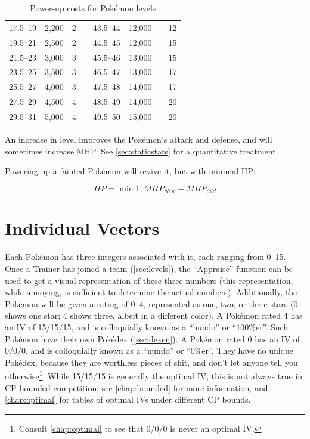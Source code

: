 \begin{table}
\begin{tabular}[ht]{rrrr|rrrr}
17.5--19 & 2,200 & 2 & & 43.5--44 & 12,000 &    & 12 \\
19.5--21 & 2,500 & 2 & & 44.5--45 & 12,000 &    & 15 \\
21.5--23 & 3,000 & 3 & & 45.5--46 & 13,000 &    & 15 \\
23.5--25 & 3,500 & 3 & & 46.5--47 & 13,000 &    & 17 \\
25.5--27 & 4,000 & 3 & & 47.5--48 & 14,000 &    & 17 \\ 
27.5--29 & 4,500 & 4 & & 48.5--49 & 14,000 &    & 20 \\
29.5--31 & 5,000 & 4 & & 49.5--50 & 15,000 &    & 20 \\
\end{tabular}
\caption{Power-up costs for Pokémon levels}
\label{table:powerups}
\end{table}
An increase in level improves the Pokémon's attack and defense, and
  will sometimes increase MHP\@.
See \autoref{sec:staticstats} for a quantitative treatment.

Powering up a fainted Pokémon will revive it, but with minimal HP\@:

\[ HP = \min{1, MHP_{New} - MHP_{Old} } \]

\section{Individual Vectors}
\label{sec:ivs}
Each Pokémon has three integers associated with it, each ranging from 0--15.
Once a Trainer has joined a team (\autoref{sec:levels}), the ``Appraise'' function can be used to
  get a visual representation of these three numbers (this representation,
  while annoying, is sufficient to determine the actual numbers).
Additionally, the Pokémon will be given a rating of 0--4, represented as
  one, two, or three stars (0 shows one star; 4 shows three, albeit in a different color).
A Pokémon rated 4 has an IV of 15/15/15, and is colloquially known as a ``hundo'' or ``100\%er''.
Such Pokémon have their own Pokédex (\autoref{sec:dexen}).
A Pokémon rated 0 has an IV of 0/0/0, and is colloquially known as a ``nundo'' or ``0\%er''.
They have no unique Pokédex, because they are worthless pieces of shit,
  and don't let anyone tell you otherwise\footnote{Consult \autoref{chap:optimal}
  to see that 0/0/0 is never an optimal IV.}.
While 15/15/15 is generally the optimal IV, this is not always true in CP-bounded
  competition; see \autoref{chap:bounded} for more information,
  and \autoref{chap:optimal} for tables of optimal IVs under different CP bounds.

